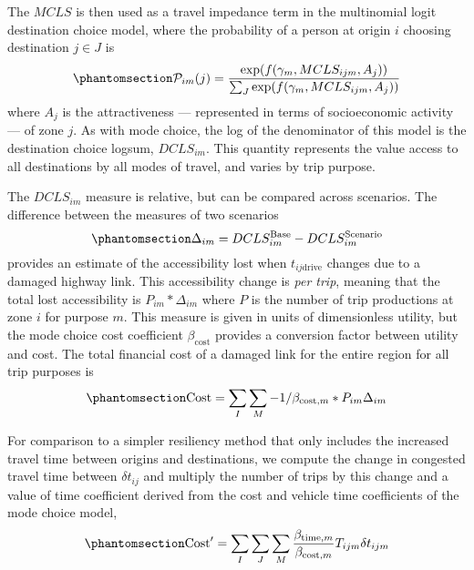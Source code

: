 \documentclass[]{ascelike-new}
\begin{document}
The \(MCLS\) is then used as a travel impedance term in the multinomial
logit destination choice model, where the probability of a person at
origin \(i\) choosing destination \(j \in J\) is
\begin{equation}\phantomsection\label{eq-dcp}{
\mathcal{P}_{im}(j) = \frac{\exp(f(\gamma_{m}, MCLS_{ijm}, A_j))}{\sum_{J}\exp(f(\gamma_{m}, MCLS_{ijm}, A_j))}
}\end{equation} where \(A_j\) is the attractiveness --- represented in
terms of socioeconomic activity --- of zone \(j\). As with mode choice,
the log of the denominator of this model is the destination choice
logsum, \(DCLS_{im}\). This quantity represents the value access to all
destinations by all modes of travel, and varies by trip purpose.

The \(DCLS_{im}\) measure is relative, but can be compared across
scenarios. The difference between the measures of two scenarios
\begin{equation}\phantomsection\label{eq-deltas}{
\Delta_{im} = DCLS_{im}^{\mathrm{Base}} - DCLS_{im}^{\mathrm{Scenario}}
}\end{equation} provides an estimate of the accessibility lost when
\(t_{ij\mathrm{drive}}\) changes due to a damaged highway link. This
accessibility change is \emph{per trip}, meaning that the total lost
accessibility is \(P_{im} * \Delta_{im}\) where \(P\) is the number of
trip productions at zone \(i\) for purpose \(m\). This measure is given
in units of dimensionless utility, but the mode choice cost coefficient
\(\beta_{\mathrm{cost}}\) provides a conversion factor between utility
and cost. The total financial cost of a damaged link for the entire
region for all trip purposes is
\begin{equation}\phantomsection\label{eq-totalcost}{
\mathrm{Cost} = \sum_{I}\sum_{M} -1 / \beta_{\mathrm{cost},m} * P_{im} \Delta_{im}
}\end{equation}

For comparison to a simpler resiliency method that only includes the
increased travel time between origins and destinations, we compute the
change in congested travel time between \(\delta t_{ij}\) and multiply
the number of trips by this change and a value of time coefficient
derived from the cost and vehicle time coefficients of the mode choice
model, \begin{equation}\phantomsection\label{eq-ttmethod}{
\mathrm{Cost}' =  \sum_I \sum_J \sum_M \frac{\beta_{\mathrm{time}, m} }{\beta_{\mathrm{cost}, m}} T_{ijm} \delta t_{ijm}
}\end{equation}
\end{document}
